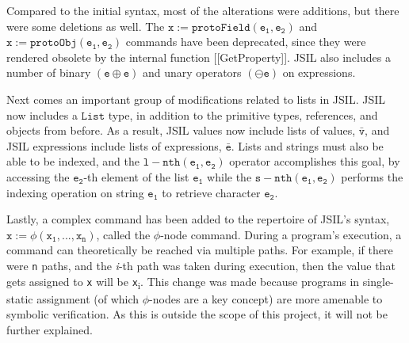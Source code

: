 \documentclass[a4paper,11pt,twoside]{report}
\begin{document}
Compared to the initial syntax, most of the alterations were additions, but there were some deletions as well. The $\mathtt{x := protoField(e_1, e_2)}$ and $\mathtt{x := protoObj(e_1, e_2)}$ commands have been deprecated, since they were rendered obsolete by the internal function [[GetProperty]]. JSIL also includes a number of binary $(\mathtt{e} \oplus \mathtt{e})$ and unary operators $(\ominus \mathtt{e})$ on expressions.

Next comes an important group of modifications related to lists in JSIL. JSIL now includes a $\mathtt{List}$ type, in addition to the primitive types, references, and objects from before. As a result, JSIL values now include lists of values, $\bar{\mathtt{v}}$, and JSIL expressions include lists of expressions, $\bar{\mathtt{e}}$. Lists and strings must also be able to be indexed, and the $\mathtt{l-nth (e_1, e_2)}$ operator accomplishes this goal, by accessing the $\mathtt{e_2}$-th element of the list $\mathtt{e_1}$ while the $\mathtt{s-nth (e_1, e_2)}$  performs the indexing operation on string $\mathtt{e_1}$ to retrieve character $\mathtt{e_2}$. 

Lastly, a complex command has been added to the repertoire of JSIL's syntax, $\mathtt{x} := \phi(\mathtt{x_1}, ... , \mathtt{x_n})$, called the $\phi$-node command. During a program's execution, a command can theoretically be reached via multiple paths. For example, if there were \texttt{n} paths, and the \textit{i}-th path was taken during execution, then the value that gets assigned to \texttt{x} will be \texttt{x}\textsubscript{i}. This change was made because programs in single-static assignment (of which $\phi$-nodes are a key concept) are more amenable to symbolic verification. As this is outside the scope of this project, it will not be further explained.
\end{document}
